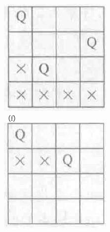 \documentclass[10pt]{article}
\begin{document}
\includegraphics[max width=\textwidth, center]{2025_06_06_704745ea57b15b2333e5g-135(1)}\\
（f）\\
\includegraphics[max width=\textwidth, center]{2025_06_06_704745ea57b15b2333e5g-135(2)}\\
\end{document}
